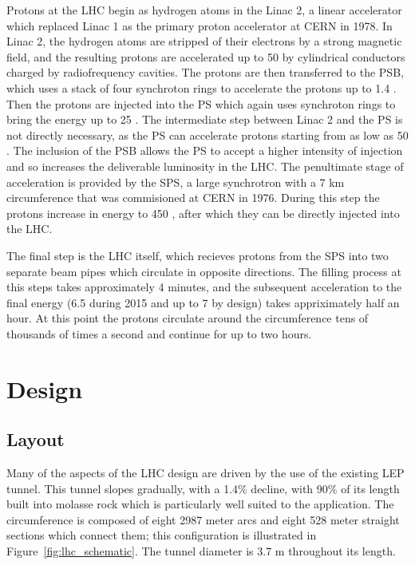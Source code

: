 Protons at the \ac{LHC} begin as hydrogen atoms in the Linac 2, a linear accelerator which replaced Linac 1 as the primary proton accelerator at CERN in 1978.
In Linac 2, the hydrogen atoms are stripped of their electrons by a strong magnetic field, and the resulting protons are accelerated up to 50 \MeV by cylindrical conductors charged by radiofrequency cavities.
The protons are then transferred to the \ac{PSB}, which uses a stack of four synchroton rings to accelerate the protons up to 1.4 \GeV.
Then the protons are injected into the \ac{PS} which again uses synchroton rings to bring the energy up to 25 \GeV.
The intermediate step between Linac 2 and the \ac{PS} is not directly necessary, as the \ac{PS} can accelerate protons starting from as low as 50 \MeV.
The inclusion of the \ac{PSB} allows the \ac{PS} to accept a higher intensity of injection and so increases the deliverable luminosity in the \ac{LHC}.
The penultimate stage of acceleration is provided by the \ac{SPS}, a large synchrotron with a 7 km circumference that was commisioned at CERN in 1976.
During this step the protons increase in energy to 450 \GeV, after which they can be directly injected into the \ac{LHC}. 


The final step is the \ac{LHC} itself, which recieves protons from the \ac{SPS} into two separate beam pipes which circulate in opposite directions.
The filling process at this steps takes approximately 4 minutes, and the subsequent acceleration to the final energy (6.5 \TeV during 2015 and up to 7 \TeV by design) takes appriximately half an hour.
At this point the protons circulate around the circumference tens of thousands of times a second and continue for up to two hours.


\section{Design}

\subsection{Layout}

Many of the aspects of the \ac{LHC} design are driven by the use of the existing \ac{LEP} tunnel. 
This tunnel slopes gradually, with a 1.4\% decline, with 90\% of its length built into molasse rock which is particularly well suited to the application.
The circumference is composed of eight 2987 meter arcs and eight 528 meter straight sections which connect them; this configuration is illustrated in Figure~\ref{fig:lhc_schematic}.
The tunnel diameter is 3.7 m throughout its length. 

